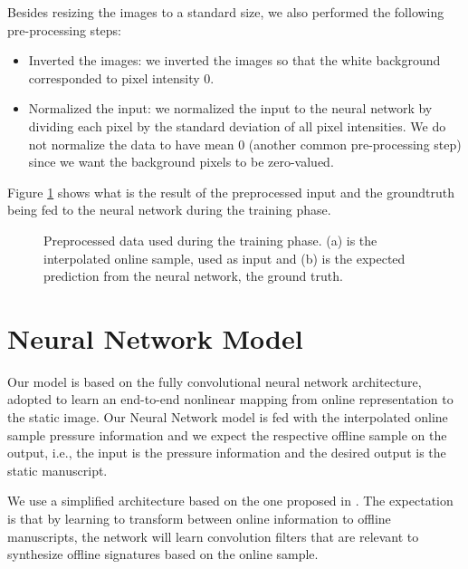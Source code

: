 Besides resizing the images to a standard size, we also performed the following pre-processing steps:
\begin{itemize}
\item Inverted the images: we inverted the images so that the white background corresponded to pixel intensity 0. 
\item Normalized the input: we normalized the input to the
neural network by dividing each pixel by the standard
deviation of all pixel intensities. We do not normalize the data to have mean 0 (another common pre-processing step) since we want the
background pixels to be zero-valued.
 
\end{itemize}

Figure \ref{fig_ironoff} shows what is the result of the preprocessed input and the groundtruth being fed to the neural network during the training phase.



\begin{figure}[!htpb]
\centering
\hspace*{0.5in} %
\caption{Preprocessed data used during the training phase. (a) is the interpolated online sample, used as input and (b) is the expected prediction from the neural network, the ground truth. } \label{fig_ironoff}
\end{figure}



\section{Neural Network Model}

Our model is based on the fully convolutional neural network architecture, adopted to learn an end-to-end nonlinear mapping from online representation to the static image. Our Neural Network model is fed with the interpolated online sample pressure information and we expect the respective offline sample on the output, i.e., the input is the pressure information and the desired output is the static manuscript.

We use a simplified architecture based on the one proposed in \cite{long2015fully}. The expectation is that by learning to transform between online information to offline manuscripts, the network will learn convolution filters that are relevant to synthesize offline signatures based on the online sample.

